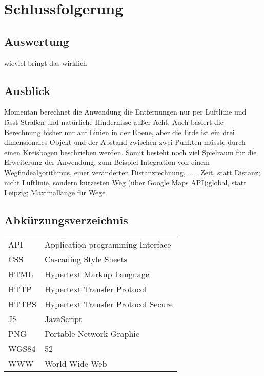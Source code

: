 \documentclass[a4paper, twoside, 12pt]{scrreprt}
\begin{document}
\chapter{Schlussfolgerung}
\section{Auswertung}
wieviel bringt das wirklich
\section{Ausblick}
Momentan berechnet die Anwendung die Entfernungen nur per Luftlinie und lässt Straßen und natürliche Hindernisse außer Acht.
Auch basiert die Berechnung bisher nur auf Linien in der Ebene, aber die Erde ist ein drei dimensionales Objekt und der Abstand zwischen zwei Punkten müsste durch einen Kreisbogen beschrieben werden.
Somit besteht noch viel Spielraum für die Erweiterung der Anwendung, zum Beispiel Integration von einem Wegfindealgorithmus, einer veränderten Distanzrechnung, ... .
Zeit, statt Distanz; nicht Luftlinie, sondern kürzesten Weg (über Google Maps API);global, statt Leipzig; Maximallänge für Wege
\section{Abkürzungsverzeichnis}
\begin{tabular}{ll}
	API		&Application programming Interface\\
	CSS		&Cascading Style Sheets\\
	HTML	&Hypertext Markup Language\\
	HTTP	&Hypertext Transfer Protocol\\
	HTTPS	&Hypertext Transfer Protocol Secure\\
	JS		&JavaScript\\
	PNG		&Portable Network Graphic\\
	WGS84	&52\\
	WWW		&World Wide Web\\
\end{tabular}

{}

\end{document}
